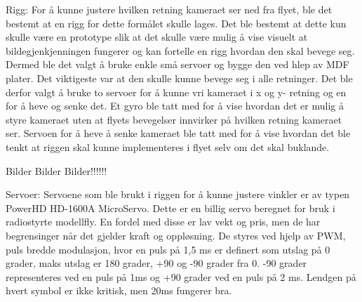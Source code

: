 Rigg:
For å kunne justere hvilken retning kameraet ser ned fra flyet, ble det bestemt at en rigg for dette formålet skulle lages. Det ble bestemt at dette kun skulle være en prototype slik at det skulle være mulig å vise visuelt at bildegjenkjenningen fungerer og kan fortelle en rigg hvordan den skal bevege seg. Dermed ble det valgt å bruke enkle små servoer og bygge den ved hlep av MDF plater. Det viktigeste var at den skulle kunne bevege seg i alle retninger. Det ble derfor valgt å bruke to servoer for å kunne vri kameraet i x og y- retning og en for å heve og senke det. Et gyro ble tatt med for å vise hvordan det er mulig å styre kameraet uten at flyets bevegelser innvirker på hvilken retning kameraet ser. Servoen for å heve å senke kameraet ble tatt med for å vise hvordan det ble tenkt at riggen skal kunne implementeres i flyet selv om det skal buklande. 

Bilder Bilder Bilder!!!!!!


Servoer:
Servoene som ble brukt i riggen for å kunne justere vinkler er av typen PowerHD HD-1600A MicroServo. Dette er en billig servo beregnet for bruk i radiostyrte modellfly. En fordel med disse er lav vekt og pris, men de har begrensinger når det gjelder kraft og oppløsning. De styres ved hjelp av PWM, puls bredde modulasjon, hvor en puls på 1,5 ms er definert som utslag på 0 grader, maks utslag er 180 grader, +90 og -90 grader fra 0. -90 grader representeres ved en puls på 1ms og +90 grader ved en puls på 2 ms. Lendgen på hvert symbol er ikke kritisk, men 20ms fungerer bra.
